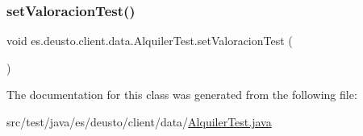 \mbox{\label{classes_1_1deusto_1_1client_1_1data_1_1_alquiler_test_aab27ba570ec581921dd72d26c0d8da6f}} 
\subsubsection{\texorpdfstring{setValoracionTest()}{setValoracionTest()}}
{\footnotesize\ttfamily void es.\+deusto.\+client.\+data.\+Alquiler\+Test.\+set\+Valoracion\+Test (\begin{DoxyParamCaption}{ }\end{DoxyParamCaption})}



The documentation for this class was generated from the following file\+:\begin{DoxyCompactItemize}
\item 
src/test/java/es/deusto/client/data/\mbox{\hyperlink{_alquiler_test_8java}{Alquiler\+Test.\+java}}\end{DoxyCompactItemize}
